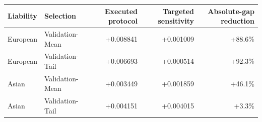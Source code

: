 \begin{tabular}{llrrr}
\toprule
Liability & Selection & Executed protocol & Targeted sensitivity & Absolute-gap reduction \\
\midrule
European & Validation-Mean & +0.008841 & +0.001009 & +88.6\% \\
European & Validation-Tail & +0.006693 & +0.000514 & +92.3\% \\
Asian & Validation-Mean & +0.003449 & +0.001859 & +46.1\% \\
Asian & Validation-Tail & +0.004151 & +0.004015 & +3.3\% \\
\bottomrule
\end{tabular}
